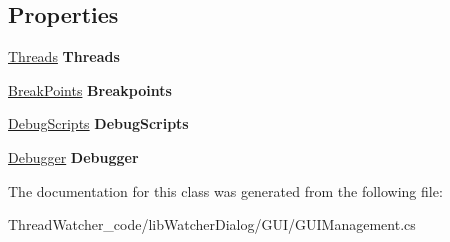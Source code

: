 \subsection*{Properties}
\begin{DoxyCompactItemize}
\item 
\hypertarget{class_thread_watcher_1_1_g_u_i_1_1_g_u_i_management_a07062e4c9f18a7035cac67398aa0072f}{\hyperlink{classlib_watcher_dialog_1_1_threads}{Threads} {\bfseries Threads}}\label{class_thread_watcher_1_1_g_u_i_1_1_g_u_i_management_a07062e4c9f18a7035cac67398aa0072f}

\item 
\hypertarget{class_thread_watcher_1_1_g_u_i_1_1_g_u_i_management_a8c40db39ac85f6c533e36cb33bfc4ff2}{\hyperlink{classlib_watcher_dialog_1_1_break_points}{Break\+Points} {\bfseries Breakpoints}}\label{class_thread_watcher_1_1_g_u_i_1_1_g_u_i_management_a8c40db39ac85f6c533e36cb33bfc4ff2}

\item 
\hypertarget{class_thread_watcher_1_1_g_u_i_1_1_g_u_i_management_ad676f648afaedd714d8cd4a9f380d737}{\hyperlink{classlib_watcher_dialog_1_1_debug_scripts}{Debug\+Scripts} {\bfseries Debug\+Scripts}}\label{class_thread_watcher_1_1_g_u_i_1_1_g_u_i_management_ad676f648afaedd714d8cd4a9f380d737}

\item 
\hypertarget{class_thread_watcher_1_1_g_u_i_1_1_g_u_i_management_a73d66a2a1c78162305dc59b038fd68dd}{\hyperlink{class_watcher_1_1_debugger_1_1_debugger}{Debugger} {\bfseries Debugger}}\label{class_thread_watcher_1_1_g_u_i_1_1_g_u_i_management_a73d66a2a1c78162305dc59b038fd68dd}

\end{DoxyCompactItemize}


The documentation for this class was generated from the following file\+:\begin{DoxyCompactItemize}
\item 
Thread\+Watcher\+\_\+code/lib\+Watcher\+Dialog/\+G\+U\+I/G\+U\+I\+Management.\+cs\end{DoxyCompactItemize}
